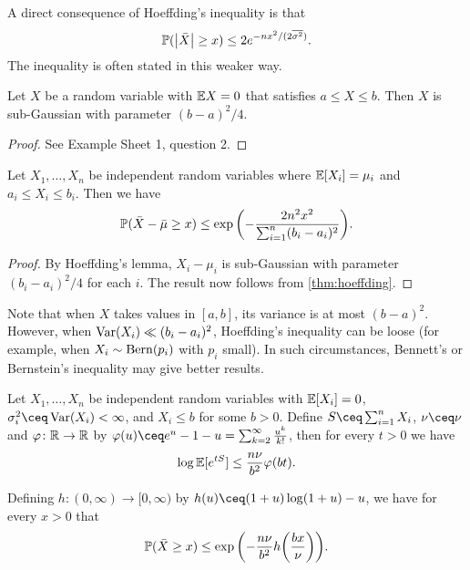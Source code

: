 \begin{remark}
	A direct consequence of Hoeffding's inequality is that
	\[
	\mathbb P(\abs{\bar X} \geq x) \leq 2 e^{-nx^2/(2\overline{\sigma^2})}.
	\]
	The inequality is often stated in this weaker way. 
\end{remark}

\begin{lemma}
	Let $X$ be a random variable with $\mathbb E X = 0$ that satisfies $a \leq X \leq b$. Then $X$ is sub-Gaussian with parameter $(b-a)^2/4$. 
\end{lemma}

\begin{proof}
	See Example Sheet 1, question 2. 
\end{proof}

\begin{corollary}
	Let $X_1, \dotsc, X_n$ be independent random variables where $\mathbb E[X_i] = \mu_i$ and $a_i \leq X_i \leq b_i$. Then we have
	\[
	\mathbb P(\bar X - \bar \mu \geq x) \leq \exp\qty(-\frac{2n^2x^2}{\sum_{i=1}^n (b_i - a_i)^2}). 
	\]
\end{corollary}

\begin{proof}
	By Hoeffding's lemma, $X_i - \mu_i$ is sub-Gaussian with parameter $(b_i - a_i)^2/4$ for each $i$. The result now follows from \cref{thm:hoeffding}.
\end{proof}

Note that when $X$ takes values in $[a, b]$, its variance is at most $(b-a)^2$. However, when $\operatorname{Var}(X_i) \ll (b_i - a_i)^2$, Hoeffding's inequality can be loose (for example, when $X_i \sim \mathrm{Bern}(p_i)$ with $p_i$ small). In such circumstances, Bennett's or Bernstein's inequality may give better results. 

\begin{theorem}
	Let $X_1, \dotsc, X_n$ be independent random variables with $\mathbb E[X_i] = 0$, $\sigma_i^2 \ceq \Var(X_i) < \infty$, and $X_i \leq b$ for some $b > 0$. Define  $S \ceq \sum_{i=1}^n X_i$, $\nu \ceq \nu$ and $\varphi \colon \mathbb R \to \mathbb R$ by $\phi(u) \ceq e^u - 1 - u = \sum_{k=2}^\infty \frac{u^k}{k!}$, then for every $t > 0$ we have
	\[
	\log\mathbb E[e^{tS}] \leq \frac{n \nu }{b^2} \varphi(bt). 
	\]
	
	Defining $h \colon (0, \infty) \to [0, \infty)$ by $h(u) \ceq (1+u)\log(1+u) - u$, we have for every $x > 0$ that
	\[
	\mathbb P(\bar X \geq x) \leq \exp\qty(-\frac{n \nu}{b^2} h\qty(\frac{bx}{\nu})). 
	\]
\end{theorem}

